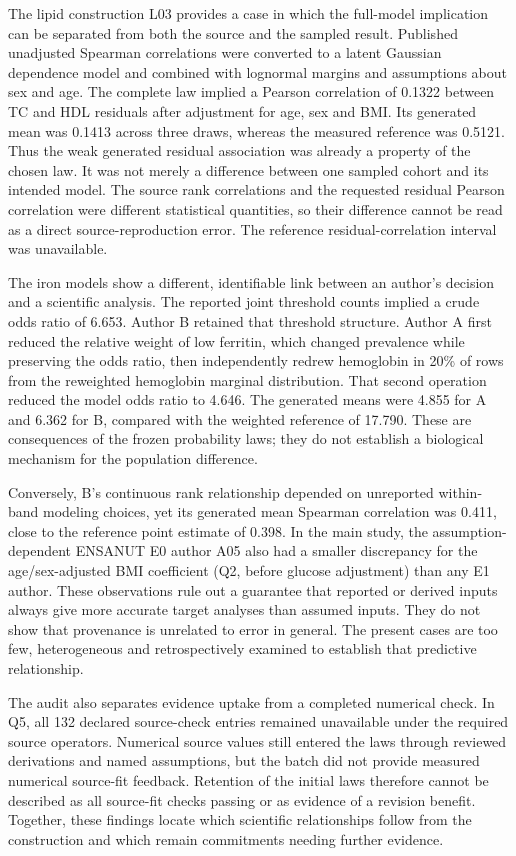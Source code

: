 \documentclass[11pt,letterpaper]{article}
\begin{document}
The lipid construction L03 provides a case in which the full-model implication can be separated from both the source and the sampled result. Published unadjusted Spearman correlations were converted to a latent Gaussian dependence model and combined with lognormal margins and assumptions about sex and age. The complete law implied a Pearson correlation of 0.1322 between TC and HDL residuals after adjustment for age, sex and BMI. Its generated mean was 0.1413 across three draws, whereas the measured reference was 0.5121. Thus the weak generated residual association was already a property of the chosen law. It was not merely a difference between one sampled cohort and its intended model. The source rank correlations and the requested residual Pearson correlation were different statistical quantities, so their difference cannot be read as a direct source-reproduction error. The reference residual-correlation interval was unavailable.


The iron models show a different, identifiable link between an author's decision and a scientific analysis. The reported joint threshold counts implied a crude odds ratio of 6.653. Author B retained that threshold structure. Author A first reduced the relative weight of low ferritin, which changed prevalence while preserving the odds ratio, then independently redrew hemoglobin in 20\% of rows from the reweighted hemoglobin marginal distribution. That second operation reduced the model odds ratio to 4.646. The generated means were 4.855 for A and 6.362 for B, compared with the weighted reference of 17.790. These are consequences of the frozen probability laws; they do not establish a biological mechanism for the population difference.


Conversely, B's continuous rank relationship depended on unreported within-band modeling choices, yet its generated mean Spearman correlation was 0.411, close to the reference point estimate of 0.398. In the main study, the assumption-dependent ENSANUT E0 author A05 also had a smaller discrepancy for the age/\allowbreak{}sex-adjusted BMI coefficient (Q2, before glucose adjustment) than any E1 author. These observations rule out a guarantee that reported or derived inputs always give more accurate target analyses than assumed inputs. They do not show that provenance is unrelated to error in general. The present cases are too few, heterogeneous and retrospectively examined to establish that predictive relationship.


The audit also separates evidence uptake from a completed numerical check. In Q5, all 132 declared source-check entries remained unavailable under the required source operators. Numerical source values still entered the laws through reviewed derivations and named assumptions, but the batch did not provide measured numerical source-fit feedback. Retention of the initial laws therefore cannot be described as all source-fit checks passing or as evidence of a revision benefit. Together, these findings locate which scientific relationships follow from the construction and which remain commitments needing further evidence.
\end{document}
